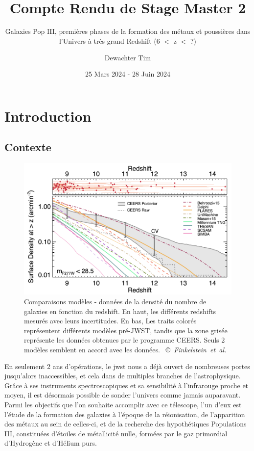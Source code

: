 \documentclass[11pt, a4paper]{article}
\title{\textbf{ \\{\Huge Compte Rendu de Stage Master 2}}}
\subtitle{Galaxies Pop III, premières phases de la formation des métaux et poussières dans l'Univers à très grand Redshift (6 $<$ z $<$ ?)}
\author{Dewachter Tim}
\date{25 Mars 2024 - 28 Juin 2024}
\newcommand{\customcite}[2]{\mbox{
  {\small \copyright} \textit{#1} \cite{#2}}
}
\begin{document}
\maketitle

\newpage

\tableofcontents

\newpage

\section{Introduction}

\subsection{Contexte}

\begin{figure}
  \centering
  \includegraphics[scale=0.5]{assets/ceers_number_galaxies.png}
  \caption{Comparaisons modèles - données de la densité du nombre de galaxies en fonction du redshift. En haut, les différents redshifts mesurés avec leurs incertitudes. En bas, Les traits colorés représentent différents modèles pré-JWST, tandis que la zone grisée représente les données obtenues par le programme CEERS. Seuls 2 modèles semblent en accord avec les données. \customcite{Finkelstein et al.}{2023arXiv231104279F}}
  \label{fig:densite_galaxies}
\end{figure}

En seulement 2 ans d'opérations, le \gls{jwst} nous a déjà ouvert de nombreuses portes jusqu'alors inaccessibles, et cela dans de multiples branches de l'astrophysique. Grâce à ses instruments spectroscopiques et sa sensibilité à l'infrarouge proche et moyen, il est désormais possible de sonder l'univers comme jamais auparavant. Parmi les objectifs que l'on souhaite accomplir avec ce télescope, l'un d'eux est l'étude de la formation des galaxies à l'époque de la réionisation, de l'apparition des métaux au sein de celles-ci, et de la recherche des hypothétiques Populations III, constituées d'étoiles de métallicité nulle, formées par le gaz primordial d'Hydrogène et d'Hélium purs.
\end{document}
